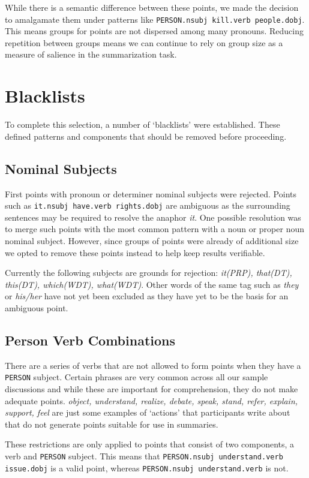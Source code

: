     While there is a semantic difference between these points, we made the decision to amalgamate them under patterns like \texttt{PERSON.nsubj kill.verb people.dobj}. This means groups for points are not dispersed among many pronouns. Reducing repetition between groups means we can continue to rely on group size as a measure of salience in the summarization task.

  \section{Blacklists}
    To complete this selection, a number of `blacklists' were established. These defined patterns and components that should be removed before proceeding.
    \tocless\subsection{Nominal Subjects}
      First points with pronoun or determiner nominal subjects were rejected. Points such as \texttt{it.nsubj have.verb rights.dobj} are ambiguous as the surrounding sentences may be required to resolve the anaphor \textit{it}. One possible resolution was to merge such points with the most common pattern with a noun or proper noun nominal subject. However, since groups of points were already of additional size we opted to remove these points instead to help keep results verifiable.

      Currently the following subjects are grounds for rejection: \textit{it(PRP), that(DT), this(DT), which(WDT), what(WDT)}. Other words of the same tag such as \textit{they} or \textit{his/her} have not yet been excluded as they have yet to be the basis for an ambiguous point.

    \tocless\subsection{Person Verb Combinations}
      There are a series of verbs that are not allowed to form points when they have a \texttt{PERSON} subject. Certain phrases are very common across all our sample discussions and while these are important for comprehension, they do not make adequate points. \textit{object, understand, realize, debate, speak, stand, refer, explain, support, feel} are just some examples of `actions' that participants write about that do not generate points suitable for use in summaries.

      These restrictions are only applied to points that consist of two components, a verb and \texttt{PERSON} subject. This means that \texttt{PERSON.nsubj understand.verb issue.dobj} is a valid point, whereas \texttt{PERSON.nsubj understand.verb} is not.

